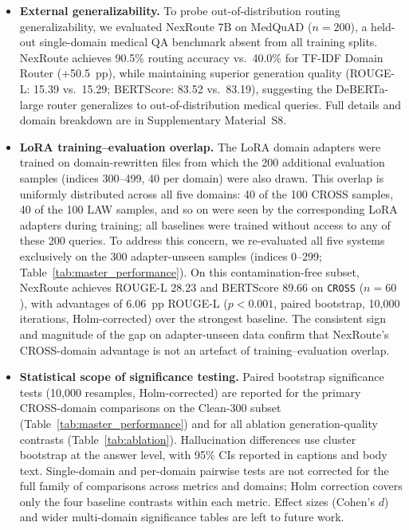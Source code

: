 \documentclass[a4paper,fleql]{cas-sc}
\begin{document}
\begin{itemize}
shared-lineage caveat in mind, particularly for comparisons against Qwen-family
72B baselines.
An earlier attempt to use Llama-3.1-70B-Instruct as an
independent judge ($n{=}200$) revealed a ceiling effect (92.5\% of scores at 9/10,
inter-model range ${<}0.3$ points; see Section~\ref{sec:factuality}),
motivating our adoption of sentence-level NLI as the primary factuality metric.
\item \textbf{External generalizability.}
To probe out-of-distribution routing generalizability, we evaluated NexRoute 7B
on MedQuAD \citep{ben2019question} ($n{=}200$), a held-out single-domain medical
QA benchmark absent from all training splits. NexRoute achieves 90.5\% routing
accuracy vs.\ 40.0\% for TF-IDF Domain Router (+50.5~pp), while maintaining superior
generation quality (ROUGE-L: 15.39 vs.\ 15.29; BERTScore: 83.52 vs.\ 83.19),
suggesting the DeBERTa-large router generalizes to out-of-distribution medical
queries. Full details and domain breakdown are in Supplementary Material~S8.
\item \textbf{LoRA training--evaluation overlap.}
The LoRA domain adapters were trained on domain-rewritten files from which
the 200 additional evaluation samples (indices 300--499, 40 per domain) were
also drawn. This overlap is uniformly distributed across all five domains:
40 of the 100 CROSS samples, 40 of the 100 LAW samples, and so on were seen
by the corresponding LoRA adapters during training; all baselines were trained
without access to any of these 200 queries.
To address this concern, we re-evaluated all five systems exclusively on the
300 adapter-unseen samples (indices 0--299; Table~\ref{tab:master_performance}).
On this contamination-free subset, NexRoute achieves ROUGE-L 28.23 and
BERTScore 89.66 on \texttt{CROSS} ($n{=}60$), with advantages of 6.06~pp
ROUGE-L ($p{<}0.001$, paired bootstrap, 10,000 iterations, Holm-corrected)
over the strongest baseline. The consistent sign and magnitude of the gap on
adapter-unseen data confirm that NexRoute's CROSS-domain advantage is not
an artefact of training--evaluation overlap.

\item \textbf{Statistical scope of significance testing.}
Paired bootstrap significance tests (10,000 resamples, Holm-corrected) are
reported for the primary CROSS-domain comparisons on the Clean-300 subset
(Table~\ref{tab:master_performance}) and for all ablation generation-quality
contrasts (Table~\ref{tab:ablation}). Hallucination differences use cluster
bootstrap at the answer level, with 95\% CIs reported in captions and body text.
Single-domain and per-domain pairwise tests are not corrected for the full family
of comparisons across metrics and domains; Holm correction covers only the four
baseline contrasts within each metric.
Effect sizes (Cohen's $d$) and wider multi-domain significance tables are
left to future work.


\end{itemize}
\end{document}
